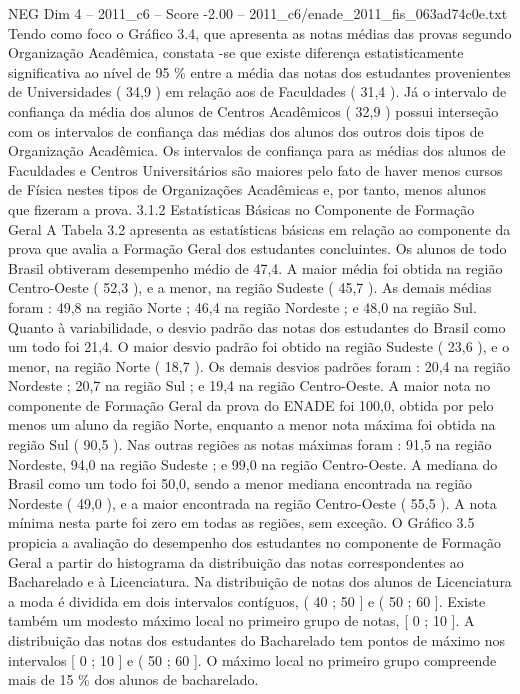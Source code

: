\begin{textsample}{NEG Dim 4 – 2011\_c6 – Score -2.00 – 2011\_c6/enade\_2011\_fis\_063ad74c0e.txt}
Tendo como foco o Gráfico 3.4, que apresenta as notas médias das provas segundo Organização Acadêmica, constata -se que existe diferença estatisticamente significativa ao nível de 95 \% entre a média das notas dos estudantes provenientes de Universidades ( 34,9 ) em relação aos de Faculdades ( 31,4 ).
Já o intervalo de confiança da média dos alunos de Centros Acadêmicos ( 32,9 ) possui interseção com os intervalos de confiança das médias dos alunos dos outros dois tipos de Organização Acadêmica.
Os intervalos de confiança para as médias dos alunos de Faculdades e Centros Universitários são maiores pelo fato de haver menos cursos de Física nestes tipos de Organizações Acadêmicas e, por tanto, menos alunos que fizeram a prova. 3.1.2 Estatísticas Básicas no Componente de Formação Geral A Tabela 3.2 apresenta as estatísticas básicas em relação ao componente da prova que avalia a Formação Geral dos estudantes concluintes.
Os alunos de todo Brasil obtiveram desempenho médio de 47,4.
A maior média foi obtida na região Centro-Oeste ( 52,3 ), e a menor, na região Sudeste ( 45,7 ).
As demais médias foram : 49,8 na região Norte ; 46,4 na região Nordeste ; e 48,0 na região Sul.
Quanto à variabilidade, o desvio padrão das notas dos estudantes do Brasil como um todo foi 21,4.
O maior desvio padrão foi obtido na região Sudeste ( 23,6 ), e o menor, na região Norte ( 18,7 ).
Os demais desvios padrões foram : 20,4 na região Nordeste ; 20,7 na região Sul ; e 19,4 na região Centro-Oeste.
A maior nota no componente de Formação Geral da prova do ENADE foi 100,0, obtida por pelo menos um aluno da região Norte, enquanto a menor nota máxima foi obtida na região Sul ( 90,5 ).
Nas outras regiões as notas máximas foram : 91,5 na região Nordeste, 94,0 na região Sudeste ; e 99,0 na região Centro-Oeste.
A mediana do Brasil como um todo foi 50,0, sendo a menor mediana encontrada na região Nordeste ( 49,0 ), e a maior encontrada na região Centro-Oeste ( 55,5 ).
A nota mínima nesta parte foi zero em todas as regiões, sem exceção.
O Gráfico 3.5 propicia a avaliação do desempenho dos estudantes no componente de Formação Geral a partir do histograma da distribuição das notas correspondentes ao Bacharelado e à Licenciatura.
Na distribuição de notas dos alunos de Licenciatura a moda é dividida em dois intervalos contíguos, ( 40 ; 50 ] e ( 50 ; 60 ].
Existe também um modesto máximo local no primeiro grupo de notas, [ 0 ; 10 ].
A distribuição das notas dos estudantes do Bacharelado tem pontos de máximo nos intervalos [ 0 ; 10 ] e ( 50 ; 60 ].
O máximo local no primeiro grupo compreende mais de 15 \% dos alunos de bacharelado.

\end{textsample}
